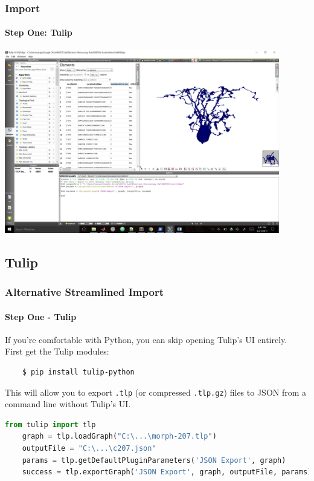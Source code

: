 \documentclass[11pt]{beamer}
\begin{document}
\begin{frame}
	\frametitle{Import}
	\framesubtitle{Step One: Tulip}
	\includegraphics[width = 0.9\textwidth]{tulip_python}
\end{frame}

\subsection{Tulip}
\begin{frame}[fragile]
	\frametitle{Alternative Streamlined Import}
	\framesubtitle{Step One - Tulip}
	If you're comfortable with Python, you can skip opening Tulip's UI entirely.\\
	First get the Tulip modules:
	\begin{lstlisting}
	$ pip install tulip-python\end{lstlisting}
	This will allow you to export \texttt{.tlp} (or compressed \texttt{.tlp.gz}) files to JSON from a command line without Tulip's UI.
	\begin{lstlisting}[language=python]
	from tulip import tlp
	graph = tlp.loadGraph("C:\...\morph-207.tlp")
	outputFile = "C:\...\c207.json"
	params = tlp.getDefaultPluginParameters('JSON Export', graph)
	success = tlp.exportGraph('JSON Export', graph, outputFile, params)\end{lstlisting}
\end{frame}
\end{document}
